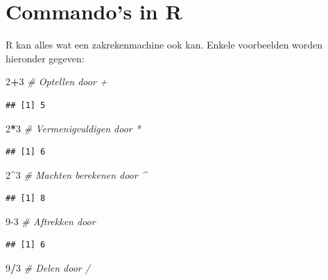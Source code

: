 \documentclass[
]{book}
\newenvironment{Shaded}{\begin{snugshade}}{\end{snugshade}}
\newcommand{\CommentTok}[1]{\textcolor[rgb]{0.56,0.35,0.01}{\textit{#1}}}
\newcommand{\DecValTok}[1]{\textcolor[rgb]{0.00,0.00,0.81}{#1}}
\newcommand{\SpecialCharTok}[1]{\textcolor[rgb]{0.81,0.36,0.00}{\textbf{#1}}}
\begin{document}
\hypertarget{commandos-in-r}{%
\chapter{Commando's in R}\label{commandos-in-r}}

R kan alles wat een zakrekenmachine ook kan. Enkele voorbeelden worden hieronder gegeven:

\begin{Shaded}
\begin{Highlighting}[]
\DecValTok{2}\SpecialCharTok{+}\DecValTok{3} \CommentTok{\# Optellen door \textquotesingle{}+\textquotesingle{}}
\end{Highlighting}
\end{Shaded}

\begin{verbatim}
## [1] 5
\end{verbatim}

\begin{Shaded}
\begin{Highlighting}[]
\DecValTok{2}\SpecialCharTok{*}\DecValTok{3} \CommentTok{\# Vermenigvuldigen door \textquotesingle{}*\textquotesingle{}}
\end{Highlighting}
\end{Shaded}

\begin{verbatim}
## [1] 6
\end{verbatim}

\begin{Shaded}
\begin{Highlighting}[]
\DecValTok{2}\SpecialCharTok{\^{}}\DecValTok{3} \CommentTok{\# Machten berekenen door \textquotesingle{}\^{}\textquotesingle{}}
\end{Highlighting}
\end{Shaded}

\begin{verbatim}
## [1] 8
\end{verbatim}

\begin{Shaded}
\begin{Highlighting}[]
\DecValTok{9{-}3} \CommentTok{\# Aftrekken door \textquotesingle{}{-}\textquotesingle{}}
\end{Highlighting}
\end{Shaded}

\begin{verbatim}
## [1] 6
\end{verbatim}

\begin{Shaded}
\begin{Highlighting}[]
\DecValTok{9}\SpecialCharTok{/}\DecValTok{3} \CommentTok{\# Delen door \textquotesingle{}/\textquotesingle{}}
\end{Highlighting}
\end{Shaded}
\end{document}
